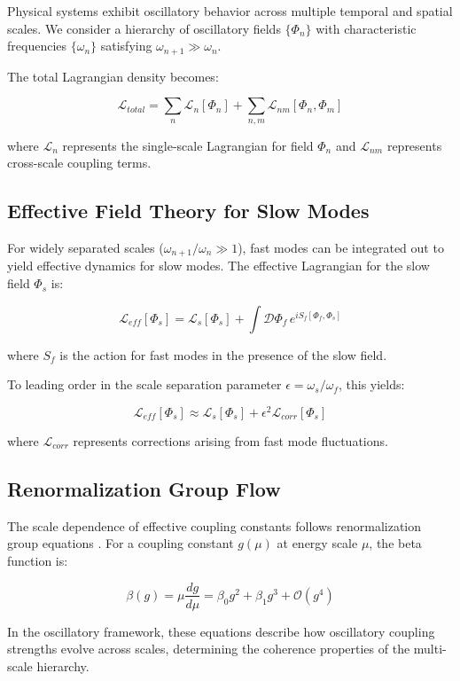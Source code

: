 \documentclass[11pt]{article}
\theoremstyle{remark}
\begin{document}
Physical systems exhibit oscillatory behavior across multiple temporal and spatial scales. We consider a hierarchy of oscillatory fields $\{\Phi_n\}$ with characteristic frequencies $\{\omega_n\}$ satisfying $\omega_{n+1} \gg \omega_n$.

The total Lagrangian density becomes:

$$\mathcal{L}_{total} = \sum_n \mathcal{L}_n[\Phi_n] + \sum_{n,m} \mathcal{L}_{nm}[\Phi_n, \Phi_m]$$

where $\mathcal{L}_n$ represents the single-scale Lagrangian for field $\Phi_n$ and $\mathcal{L}_{nm}$ represents cross-scale coupling terms.

\subsection{Effective Field Theory for Slow Modes}

For widely separated scales ($\omega_{n+1}/\omega_n \gg 1$), fast modes can be integrated out to yield effective dynamics for slow modes. The effective Lagrangian for the slow field $\Phi_s$ is:

$$\mathcal{L}_{eff}[\Phi_s] = \mathcal{L}_s[\Phi_s] + \int \mathcal{D}\Phi_f \, e^{iS_f[\Phi_f, \Phi_s]}$$

where $S_f$ is the action for fast modes in the presence of the slow field.

To leading order in the scale separation parameter $\epsilon = \omega_s/\omega_f$, this yields:

$$\mathcal{L}_{eff}[\Phi_s] \approx \mathcal{L}_s[\Phi_s] + \epsilon^2 \mathcal{L}_{corr}[\Phi_s]$$

where $\mathcal{L}_{corr}$ represents corrections arising from fast mode fluctuations.

\subsection{Renormalization Group Flow}

The scale dependence of effective coupling constants follows renormalization group equations \cite{weinberg1995quantum,peskin1995introduction}. For a coupling constant $g(\mu)$ at energy scale $\mu$, the beta function is:

$$\beta(g) = \mu \frac{dg}{d\mu} = \beta_0 g^2 + \beta_1 g^3 + \mathcal{O}(g^4)$$

In the oscillatory framework, these equations describe how oscillatory coupling strengths evolve across scales, determining the coherence properties of the multi-scale hierarchy.
\end{document}
